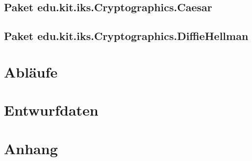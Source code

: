 \documentclass{article}
\begin{document}
\subsection{Paket edu.kit.iks.Cryptographics.Caesar}
\subsection{Paket edu.kit.iks.Cryptographics.DiffieHellman}

\section{Abläufe}

\section{Entwurfdaten}

\section{Anhang}
\glsaddall
\printglossary[numberedsection, style=altlist]
\end{document}
